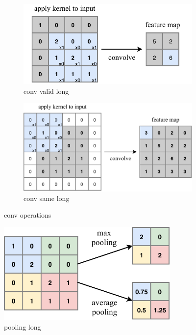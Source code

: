 \begin{figure}
    \centering
    \begin{subfigure}[b]{0.71\textwidth}
        \centering
        \includegraphics[width=\textwidth]{diagrams/6-cvn/conv_valid.pdf}
        \caption{conv valid long}
        \label{fig:conv_valid}
    \end{subfigure}
    \hfill
    \begin{subfigure}[b]{0.9\textwidth}
        \centering
        \includegraphics[width=\textwidth]{diagrams/6-cvn/conv_same.pdf}
        \caption{conv same long}
        \label{fig:conv_same}
    \end{subfigure}
    \caption{conv operations}
    \label{fig:conv_operations}
\end{figure}

\begin{figure}
    \includegraphics[width=0.8\textwidth]{diagrams/6-cvn/pooling.pdf}
    \caption[pooling short]
    {pooling long}
    \label{fig:pooling}
\end{figure}

